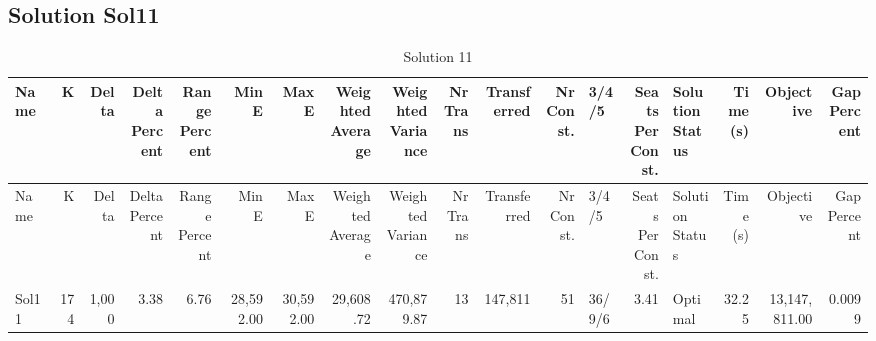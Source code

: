 \documentclass[a4paper]{article}
\begin{document}
\clearpage
\subsection{Solution Sol11}

{\scriptsize
\begin{longtable}{lrrrrrrrrrrrlrlrrr}
\caption{Solution 11}
\\ \toprule
Name &K &Delta &\shortstack{Delta\\Percent} &\shortstack{Range\\Percent} &Min E &Max E &\shortstack{Weighted\\Average} &\shortstack{Weighted\\Variance} &\shortstack{Nr\\Trans} &Transferred &\shortstack{Nr\\Const.} &3/4/5 &\shortstack{Seats\\Per\\Const.} &\shortstack{Solution\\Status} &\shortstack{Time\\(s)} &Objective &\shortstack{Gap\\Percent} \\ \midrule
\endfirsthead
\toprule
Name &K &Delta &\shortstack{Delta\\Percent} &\shortstack{Range\\Percent} &Min E &Max E &\shortstack{Weighted\\Average} &\shortstack{Weighted\\Variance} &\shortstack{Nr\\Trans} &Transferred &\shortstack{Nr\\Const.} &3/4/5 &\shortstack{Seats\\Per\\Const.} &\shortstack{Solution\\Status} &\shortstack{Time\\(s)} &Objective &\shortstack{Gap\\Percent} \\ \midrule
\endhead
\bottomrule
\endfoot
Sol11&174&1,000& 3.38& 6.76&28,592.00&30,592.00&29,608.72&470,879.87&13&147,811&51&36/9/6& 3.41&Optimal&32.25&13,147,811.00&0.0099\\ 
\end{longtable}

}
\end{document}
